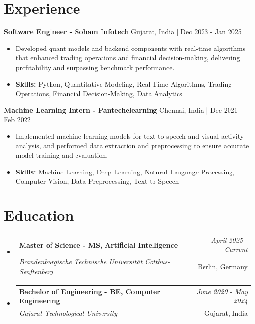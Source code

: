 \documentclass[a4paper,11pt]{article}
\makeatletter
\newcommand{\resumeSubheading}[4]{
\vspace{0.5mm}\item
    \begin{tabular*}{\linewidth}[t]{l@{\extracolsep{\fill}}r}
        \textbf{#1} & \textit{\footnotesize{#4}} \\
        \textit{\footnotesize{#3}} &  \footnotesize{#2}\\
    \end{tabular*}
    \vspace{-2.4mm}
}
\makeatother
\begin{document}
\section{\textbf{Experience}}


\vspace{1mm}
  \textbf{Software Engineer - Soham Infotech} \hfill Gujarat, India | Dec 2023 - Jan 2025
\vspace{-1.5mm} %
\begin{itemize}
  \item Developed quant models and backend components with real-time algorithms that enhanced trading operations and financial decision-making, delivering profitability and surpassing benchmark performance.

\vspace{-2mm}
  \item \textbf{Skills:} Python, Quantitative Modeling, Real-Time Algorithms, Trading Operations, Financial Decision-Making, Data Analytics
\end{itemize}

\vspace{1mm}
  \textbf{Machine Learning Intern - Pantechelearning} \hfill Chennai, India | Dec 2021 - Feb 2022
\vspace{-1.5mm} %
\begin{itemize}
  \item Implemented machine learning models for text-to-speech and visual-activity analysis, and performed data extraction and preprocessing to ensure accurate model training and evaluation.
\vspace{-2mm}
  \item \textbf{Skills:} Machine Learning, Deep Learning, Natural Language Processing, Computer Vision, Data Preprocessing, Text-to-Speech
\end{itemize}\section{\textbf{Education}}
\vspace{-0.4mm}

\begin{itemize}[leftmargin=0.15in, label={}]
\resumeSubheading
{Master of Science - MS, Artificial Intelligence }{Berlin, Germany}
{Brandenburgische Technische Universität Cottbus-Senftenberg  }{April 2025 - Current}

\vspace{1.0mm} %
\resumeSubheading
{Bachelor of Engineering - BE, Computer Engineering  }{Gujarat, India}
{Gujarat Technological University }{June 2020 - May 2024}

\end{itemize}
\end{document}
